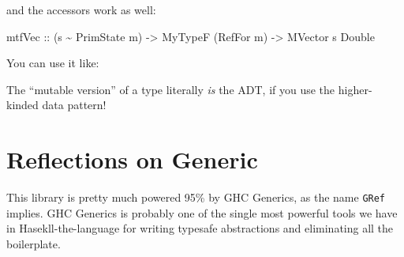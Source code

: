 \documentclass[]{article}
\newenvironment{Shaded}{}{}
\newcommand{\CommentTok}[1]{\textcolor[rgb]{0.38,0.63,0.69}{\textit{#1}}}
\newcommand{\DataTypeTok}[1]{\textcolor[rgb]{0.56,0.13,0.00}{#1}}
\newcommand{\DecValTok}[1]{\textcolor[rgb]{0.25,0.63,0.44}{#1}}
\newcommand{\FloatTok}[1]{\textcolor[rgb]{0.25,0.63,0.44}{#1}}
\newcommand{\KeywordTok}[1]{\textcolor[rgb]{0.00,0.44,0.13}{\textbf{#1}}}
\newcommand{\NormalTok}[1]{#1}
\newcommand{\OperatorTok}[1]{\textcolor[rgb]{0.40,0.40,0.40}{#1}}
\newcommand{\OtherTok}[1]{\textcolor[rgb]{0.00,0.44,0.13}{#1}}
\begin{document}
and the accessors work as well:

\begin{Shaded}
\begin{Highlighting}[]
\NormalTok{mtfVec}
\OtherTok{    ::}\NormalTok{ (s }\OperatorTok{\textasciitilde{}} \DataTypeTok{PrimState}\NormalTok{ m)}
    \OtherTok{{-}>} \DataTypeTok{MyTypeF}\NormalTok{ (}\DataTypeTok{RefFor}\NormalTok{ m)}
    \OtherTok{{-}>} \DataTypeTok{MVector}\NormalTok{ s }\DataTypeTok{Double}
\end{Highlighting}
\end{Shaded}

You can use it like:

\begin{Shaded}
\end{Shaded}

The ``mutable version'' of a type literally \emph{is} the ADT, if you use the
higher-kinded data pattern!

\hypertarget{reflections-on-generic}{%
\section{Reflections on Generic}\label{reflections-on-generic}}

This library is pretty much powered 95\% by GHC Generics, as the name
\texttt{GRef} implies. GHC Generics is probably one of the single most powerful
tools we have in Hasekll-the-language for writing typesafe abstractions and
eliminating all the boilerplate.
\end{document}
